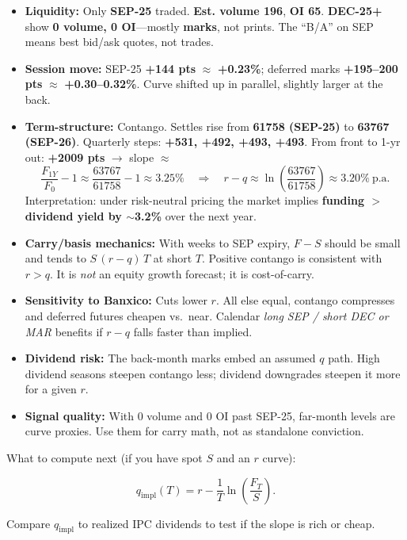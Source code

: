 \documentclass[10pt,a4paper]{article} %
\begin{document}
\begin{itemize}
  \item \textbf{Liquidity:} Only \textbf{SEP-25} traded. \textbf{Est. volume 196}, \textbf{OI 65}. \textbf{DEC-25+} show \textbf{0 volume, 0 OI}---mostly \textbf{marks}, not prints. The ``B/A'' on SEP means best bid/ask quotes, not trades.
  \item \textbf{Session move:} SEP-25 \textbf{+144 pts} $\approx$ \textbf{+0.23\%}; deferred marks \textbf{+195--200 pts} $\approx$ \textbf{+0.30--0.32\%}. Curve shifted up in parallel, slightly larger at the back.
  \item \textbf{Term-structure:} Contango. Settles rise from \textbf{61758 (SEP-25)} to \textbf{63767 (SEP-26)}. Quarterly steps: \textbf{+531, +492, +493, +493}. From front to 1-yr out: \textbf{+2009 pts} $\rightarrow$ slope $\approx$
  \[
    \frac{F_{1Y}}{F_{0}}-1 \approx \frac{63767}{61758}-1 \approx 3.25\%
    \quad\Rightarrow\quad
    r-q \approx \ln\left(\frac{63767}{61758}\right)\approx 3.20\%~\text{p.a.}
  \]
  Interpretation: under risk-neutral pricing the market implies \textbf{funding $>$ dividend yield by $\sim$3.2\%} over the next year.
  \item \textbf{Carry/basis mechanics:} With weeks to SEP expiry, $F-S$ should be small and tends to $S\,(r-q)\,T$ at short $T$. Positive contango is consistent with $r>q$. It is \emph{not} an equity growth forecast; it is cost-of-carry.
  \item \textbf{Sensitivity to Banxico:} Cuts lower $r$. All else equal, contango compresses and deferred futures cheapen vs.\ near. Calendar \emph{long SEP / short DEC or MAR} benefits if $r-q$ falls faster than implied.
  \item \textbf{Dividend risk:} The back-month marks embed an assumed $q$ path. High dividend seasons steepen contango less; dividend downgrades steepen it more for a given $r$.
  \item \textbf{Signal quality:} With 0 volume and 0 OI past SEP-25, far-month levels are curve proxies. Use them for carry math, not as standalone conviction.
\end{itemize}

What to compute next (if you have spot $S$ and an $r$ curve):

\[
q_{\text{impl}}(T)=r-\frac{1}{T}\ln\left(\frac{F_T}{S}\right).
\]

Compare $q_{\text{impl}}$ to realized IPC dividends to test if the slope is rich or cheap.
\end{document}
